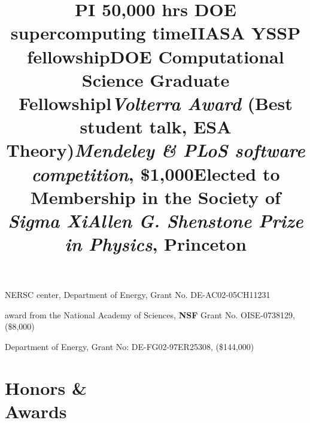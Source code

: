 \documentclass[margin]{res}
\begin{document}
\begin{resume}
\title{PI 50,000 hrs \textbf{DOE} supercomputing time}
\begin{position} 
  NERSC center, Department of Energy, Grant No. DE-AC02-05CH11231
  \vspace{-.25cm}
\end{position}

\title{\textbf{IIASA} YSSP fellowship}
\begin{position} 
  award from the National Academy of Sciences, \textbf{NSF} Grant No. OISE-0738129, (\$8,000)
  \vspace{-.25cm}
\end{position}

\title{\textbf{DOE} Computational Science Graduate Fellowship}
\begin{position} 
  Department of Energy, Grant No: DE-FG02-97ER25308, (\$144,000)
  \vspace{-.25cm}
\end{position}


\section{Honors \& \\ Awards}
\begin{format}
\title{l}\\
\body
\end{format}

\title{\emph{Volterra Award} (Best student talk, ESA Theory)}
\begin{position} \vspace{-.8cm} \end{position}

\title{\emph{Mendeley \& PLoS software competition}, \$1,000}
\begin{position} \vspace{-.8cm} \end{position}

\title{Elected to Membership in the Society of \emph{Sigma Xi}}
\begin{position}   \vspace{-.8cm} \end{position}

\title{\emph{Allen G. Shenstone Prize in Physics}, Princeton}
\begin{position}   \vspace{-.8cm} \end{position}


\end{resume}
\end{document}
